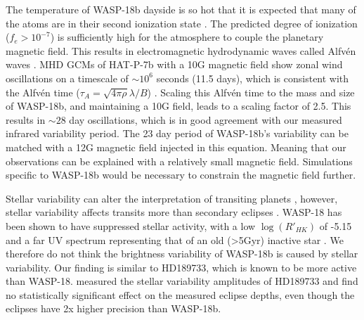 The temperature of WASP-18b dayside is so hot that it is expected that many of the atoms are in their second ionization state \citep{Helling2019a}. The predicted degree of ionization ($f_e > 10^{-7}$) is sufficiently high for the atmosphere to couple the planetary magnetic field. This results in electromagnetic hydrodynamic waves called Alfv\'en waves \citep{Alfven1942}. MHD GCMs of HAT-P-7b with a 10G magnetic field show zonal wind oscillations on a timescale of $\sim10^6$ seconds (11.5 days), which is consistent with the Alfv\'en time ($\tau_A=\sqrt{4\pi\rho}\lambda/B$) \citep{Rogers2017}. Scaling this Alfv\'en time to the mass and size of WASP-18b, and maintaining a 10G field, leads to a scaling factor of 2.5. This results in $\sim28$ day oscillations, which is in good agreement with our measured infrared variability period. The 23 day period of WASP-18b's variability can be matched with a 12G magnetic field injected in this equation. Meaning that our observations can be explained with a relatively small magnetic field. Simulations specific to WASP-18b would be necessary to constrain the magnetic field further.




Stellar variability can alter the interpretation of transiting planets \citep[e.g.,][]{Pont2008, Oshagh2014, Desert2011d}, however, stellar variability affects transits more than secondary eclipses \citep{Zellem2017}. WASP-18 has been shown to have suppressed stellar activity, with a low $\log(R'_{HK})$ of -5.15 \citep{Lanza2014} and a far UV spectrum representing that of an old (>5Gyr) inactive star \citep{Fossati2018}. We therefore do not think the brightness variability of WASP-18b is caused by stellar variability. Our finding is similar to HD189733, which is known to be more active than WASP-18. \citet{Kilpatrick2020} measured the stellar variability amplitudes of HD189733 and find no statistically significant effect on the measured eclipse depths, even though the eclipses have 2x higher precision than WASP-18b.

